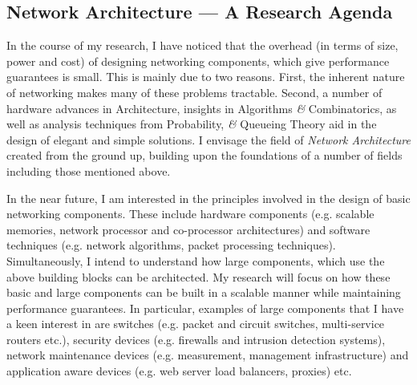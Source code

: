 \documentclass[11pt, a4paper]{article}
\begin{document}
\begin{small}
\begin{enumerate}
\end{enumerate}


\subsection*{Network Architecture ---  A Research Agenda}

   In the course of my research, I have noticed that the overhead (in terms
of size, power and cost) of designing networking components, which give 
performance guarantees is small. 
This is mainly due to two reasons. First, the inherent nature of 
networking makes many of these problems tractable. Second, a number of
hardware advances in Architecture, insights in Algorithms {\it \&} Combinatorics, 
as well as analysis techniques from Probability, {\it \&} Queueing Theory 
aid in the design of elegant and simple solutions.
I envisage the field of {\it Network Architecture} created from the 
ground up, building upon the foundations of a number of fields
including those mentioned above.


In the near future, I am interested in the 
principles involved in the design of basic networking 
components. These include
hardware components (e.g. scalable memories, 
network processor and co-processor architectures) and 
software techniques (e.g. network algorithms, packet processing 
techniques). 
  Simultaneously, I intend to understand how large components, which use
the above building blocks can be architected.
My research will focus on how these basic and large
components can be built in a scalable manner while maintaining 
performance guarantees. 
In particular, examples of large components that I have a keen
interest in are switches 
(e.g. packet and circuit switches, multi-service routers etc.), 
security devices (e.g. firewalls and intrusion detection 
systems), network maintenance devices (e.g. measurement,
management infrastructure) and application aware devices
(e.g. web server load balancers, proxies) etc. 



\end{small}
\end{document}

